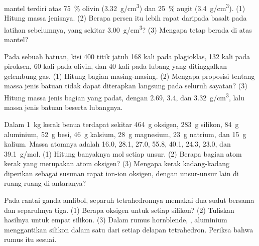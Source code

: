 \begin{exercise}[$\star\star$]\label{exo:g11:minerals:10}
 mantel terdiri atas \qty{75}{\percent} olivin
(\qty{3.32}{g/cm^3}) dan \qty{25}{\percent} augit (\qty{3.4}{g/cm^3}).
(1) Hitung massa jenisnya. (2) Berapa persen  itu lebih rapat daripada
basalt pada latihan sebelumnya, yang sekitar \qty{3.00}{g/cm^3}? (3) Mengapa
 tetap berada di atas mantel?
\end{exercise}

\begin{exercise}[$\star\star$]\label{exo:g11:minerals:11}
Pada  sebuah batuan, kisi 400 titik jatuh 168 kali pada
plagioklas, 132 kali pada piroksen, 60 kali pada olivin, dan 40 kali pada lubang
yang ditinggalkan gelembung gas. (1) Hitung bagian masing-masing. (2) Mengapa
proposisi tentang massa jenis batuan tidak dapat diterapkan langsung pada seluruh
sayatan? (3) Hitung massa jenis bagian yang padat, dengan \qty{2.69}{},
\qty{3.4}{}, dan \qty{3.32}{g/cm^3}, lalu massa jenis batuan beserta lubangnya.
\end{exercise}

\begin{exercise}[$\star\star\star$]\label{exo:g11:minerals:12}
Dalam \qty{1}{kg} kerak benua terdapat sekitar \qty{464}{g} oksigen,
\qty{283}{g} silikon, \qty{84}{g} aluminium, \qty{52}{g} besi,
\qty{46}{g} kalsium, \qty{28}{g} magnesium, \qty{23}{g} natrium, dan
\qty{15}{g} kalium. Massa atomnya adalah \qty{16.0}{}, \qty{28.1}{},
\qty{27.0}{}, \qty{55.8}{}, \qty{40.1}{}, \qty{24.3}{}, \qty{23.0}{}, dan
\qty{39.1}{g/mol}. (1) Hitung banyaknya mol setiap unsur. (2) Berapa bagian atom
kerak yang merupakan atom oksigen? (3) Mengapa kerak kadang-kadang diperikan
sebagai susunan rapat ion-ion oksigen, dengan unsur-unsur lain di ruang-ruang di
antaranya?
\end{exercise}

\begin{exercise}[$\star\star\star$]\label{exo:g11:minerals:13}
Pada rantai ganda amfibol, separuh tetrahedronnya memakai dua sudut bersama dan
separuhnya tiga. (1) Berapa oksigen untuk setiap silikon? (2) Tuliskan hasilnya
untuk empat silikon. (3) Dalam rumus hornblende,
, aluminium menggantikan silikon dalam satu
dari setiap delapan tetrahedron. Periksa bahwa rumus itu sesuai.
\end{exercise}

